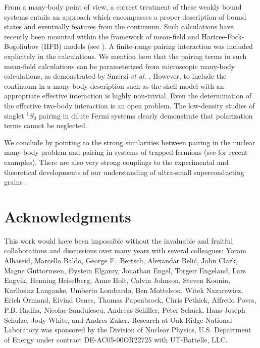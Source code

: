 \documentclass[preprint,rmp,aps,floatfix]{revtex4}
\begin{document}
From a many-body point of view, a 
correct treatment of these weakly bound systems
entails an approach which encompasses a proper description of bound states and eventually features from the continuum. Such calculations have recently been mounted within the framework of mean-field and Hartree-Fock-Bogoliubov (HFB) 
models (see \cite{sandulescu2001,sandulescu2002}). A 
finite-range pairing 
interaction was included explicitely in the calculations. 
We mention here that the pairing terms in such mean-field calculations
can be parameterized from microscopic many-body calculations, as demonstrated
by Smerzi {\em et al.} \cite{smerzi1997}.
However, 
to include
the continuum in a many-body description such as the shell-model with an
appropriate effective interaction is highly non-trivial. Even the determination
of the effective two-body interaction is an open problem. The low-density
studies of singlet $^1S_0$ pairing in dilute Fermi systems \cite{henning2000}
clearly demonstrate that polarization terms cannot be neglected. 

We conclude by pointing to the strong similarities between pairing in 
the nuclear 
many-body problem and pairing in systems of trapped fermions (see
\cite{henning_ben,bruun2000} for recent examples). 
There are also very strong couplings
to the experimental and theoretical developments of our understanding of
ultra-small superconducting grains 
\cite{tinkham95,tinkham96,tinkham98,delft2000,balian1999,mastellone98,sierra99}.


\section*{Acknowledgments}
This work would have been impossible without the 
invaluable and fruitful
collaborations and discussions over many years with several colleagues: 
Yoram Alhassid, Marcello Baldo, George F.~Bertsch, Alexandar
Beli\'c, John Clark, 
Magne Guttormsen, \O ystein Elgar\o y, Jonathan Engel, Torgeir Engeland, 
Lars Engvik, Henning Heiselberg, 
Anne Holt, Calvin Johnson, Steven Koonin, 
Karlheinz Langanke, Umberto Lombardo, Ben Mottelson, Witek Nazarewicz, 
Erich Ormand, 
Eivind Osnes, Thomas Papenbrock, Chris Pethick, 
Alfredo Poves, P.B. Radha, Nicolae Sandulescu, Andreas Schiller, 
Peter Schuck, Hans-Joseph Schulze, Jody White, and Andres Zuker.
Research at Oak Ridge National Laboratory was sponsored by the Division
of Nuclear Physics, U.S. Department of Energy under contract DE-AC05-00OR22725 
with UT-Battelle, LLC. 



\end{document}

